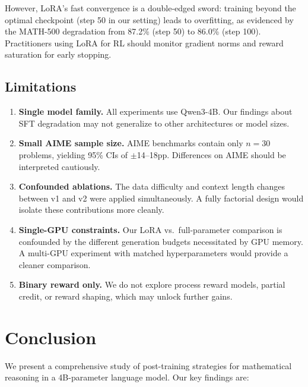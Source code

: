 \documentclass[11pt,a4paper]{article}
\begin{document}
However, LoRA's fast convergence is a double-edged sword: training beyond the optimal checkpoint (step 50 in our setting) leads to overfitting, as evidenced by the MATH-500 degradation from 87.2\% (step 50) to 86.0\% (step 100). Practitioners using LoRA for RL should monitor gradient norms and reward saturation for early stopping.

\subsection{Limitations}

\begin{enumerate}[leftmargin=*]
    \item \textbf{Single model family.} All experiments use Qwen3-4B. Our findings about SFT degradation may not generalize to other architectures or model sizes.

    \item \textbf{Small AIME sample size.} AIME benchmarks contain only $n=30$ problems, yielding 95\% CIs of $\pm$14--18pp. Differences on AIME should be interpreted cautiously.

    \item \textbf{Confounded ablations.} The data difficulty and context length changes between v1 and v2 were applied simultaneously. A fully factorial design would isolate these contributions more cleanly.

    \item \textbf{Single-GPU constraints.} Our LoRA vs.\ full-parameter comparison is confounded by the different generation budgets necessitated by GPU memory. A multi-GPU experiment with matched hyperparameters would provide a cleaner comparison.

    \item \textbf{Binary reward only.} We do not explore process reward models, partial credit, or reward shaping, which may unlock further gains.
\end{enumerate}

\section{Conclusion}

We present a comprehensive study of post-training strategies for mathematical reasoning in a 4B-parameter language model. Our key findings are:
\end{document}

